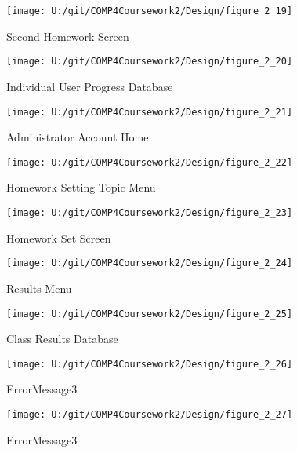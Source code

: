 \begin{figure}[H]
    \label{fig:print_function_result}\caption{Second Homework Screen}
    \texttt{[image: U:/git/COMP4Coursework2/Design/figure\_2\_19]}
\end{figure}

\begin{figure}[H]
    \label{fig:print_function_result}\caption{Individual User Progress Database}
    \texttt{[image: U:/git/COMP4Coursework2/Design/figure\_2\_20]}
\end{figure}

\begin{figure}[H]
    \label{fig:print_function_result}\caption{Administrator Account Home}
    \texttt{[image: U:/git/COMP4Coursework2/Design/figure\_2\_21]}
\end{figure}

\begin{figure}[H]
    \label{fig:print_function_result}\caption{Homework Setting Topic Menu}
    \texttt{[image: U:/git/COMP4Coursework2/Design/figure\_2\_22]}
\end{figure}

\begin{figure}[H]
    \label{fig:print_function_result}\caption{Homework Set Screen}
    \texttt{[image: U:/git/COMP4Coursework2/Design/figure\_2\_23]}
\end{figure}

\begin{figure}[H]
    \label{fig:print_function_result}\caption{Results Menu}
    \texttt{[image: U:/git/COMP4Coursework2/Design/figure\_2\_24]}
\end{figure}

\begin{figure}[H]
    \label{fig:print_function_result}\caption{Class Results Database}
    \texttt{[image: U:/git/COMP4Coursework2/Design/figure\_2\_25]}
\end{figure}

\begin{figure}[H]
    \label{fig:print_function_result}\caption{ErrorMessage3}
    \texttt{[image: U:/git/COMP4Coursework2/Design/figure\_2\_26]}
\end{figure}

\begin{figure}[H]
    \label{fig:print_function_result}\caption{ErrorMessage3}
    \texttt{[image: U:/git/COMP4Coursework2/Design/figure\_2\_27]}
\end{figure}

